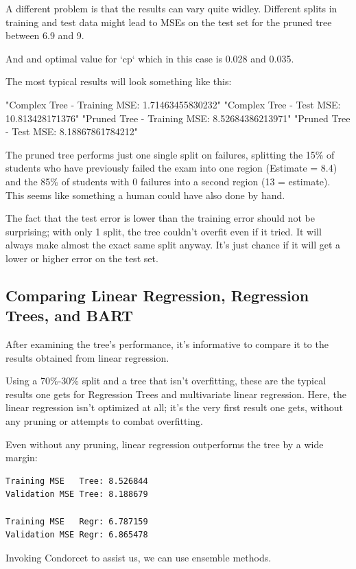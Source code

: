 \documentclass[12pt]{article}
\begin{document}
A different problem is that the results can vary quite widley. Different splits in training and test data might lead to MSEs on the test set for the pruned tree between 6.9 and 9. 

And and optimal value for `cp` which in this case is 0.028 and 0.035.


The most typical results will look something like this:

"Complex Tree - Training MSE: 1.71463455830232"
"Complex Tree -     Test MSE: 10.813428171376"
"Pruned Tree  - Training MSE: 8.52684386213971"
"Pruned Tree  -     Test MSE: 8.18867861784212"

The pruned tree performs just one single split on failures, splitting the 15\% of students who have previously failed the exam into one region (Estimate = 8.4) and the 85\% of students with 0 failures into a second region (13 = estimate). This seems like something a human could have also done by hand.

The fact that the test error is lower than the training error should not be surprising; with only 1 split, the tree couldn't overfit even if it tried. It will always make almost the exact same split anyway. It's just chance if it will get a lower or higher error on the test set.



\subsection{Comparing Linear Regression, Regression Trees, and BART}

After examining the tree's performance, it's informative to compare it to the results obtained from linear regression.

Using a 70\%-30\% split and a tree that isn't overfitting, these are the typical results one gets for Regression Trees and multivariate linear regression. Here, the linear regression isn't optimized at all; it's the very first result one gets, without any pruning or attempts to combat overfitting.

Even without any pruning, linear regression outperforms the tree by a wide margin:

\begin{verbatim}
Training MSE   Tree: 8.526844 
Validation MSE Tree: 8.188679 

Training MSE   Regr: 6.787159 
Validation MSE Regr: 6.865478
\end{verbatim}

Invoking Condorcet to assist us, we can use ensemble methods.
\end{document}
